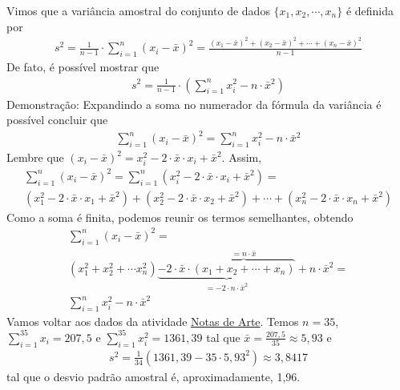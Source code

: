 Vimos que a variância amostral do conjunto de dados \(\{x_1,x_2,\cdots,x_n\}\) é definida por
\begin{equation*}
\begin{split}s^2 = \frac{1}{n-1}\cdot \sum^n_{i=1} (x_i-\bar{x})^2=\frac{(x_1-\bar{x})^2+(x_2-\bar{x})^2+\cdots+(x_n-\bar{x})^2}{n-1}\end{split}
\end{equation*}
De fato, é possível mostrar que
\begin{equation*}
\begin{split}s^2 = \frac{1}{n-1}\cdot \left (\sum^n_{i=1} x^2_i-n\cdot \bar{x}^2\right )\end{split}
\end{equation*}
Demonstração:  Expandindo a soma no numerador da fórmula da variância é possível concluir que
\begin{equation*}
\begin{split}\sum^n_{i=1}(x_i-\bar{x})^2= \sum^n_{i=1} x^2_i -n\cdot \bar{x}^2\end{split}
\end{equation*}
Lembre que \((x_i-\bar{x})^2=x^2_i-2\cdot \bar{x}\cdot x_i+\bar{x}^2\). Assim,
\begin{equation*}
\begin{split} \sum^n_{i=1}(x_i-\bar{x})^2=\sum^n_{i=1}(x^2_i-2\cdot \bar{x}\cdot x_i+\bar{x}^2)=\\ (x^2_1-2\cdot\bar{x}\cdot x_1+\bar{x}^2)+(x^2_2-2\cdot\bar{x}\cdot x_2+\bar{x}^2)+ \cdots + (x^2_n-2\cdot\bar{x}\cdot x_n+\bar{x}^2)\end{split}
\end{equation*}
Como a soma é finita, podemos reunir os termos semelhantes, obtendo
\begin{equation*}
\begin{split}\sum^n_{i=1}(x_i-\bar{x})^2= \\ (x^2_1+x^2_2+\cdots x^2_n)\underbrace{-2\cdot \bar{x}\cdot \overbrace{(x_1+x_2+\cdots+x_n)}^{=n\cdot \bar{x}}}_{=-2\cdot n\cdot \bar{x}^2}+n\cdot \bar{x}^2= \\ \sum^n_{i=1} x^2_i-n\cdot\bar{x}^2\end{split}
\end{equation*}
Vamos voltar aos dados da atividade \hyperref[\detokenize{PE104-0:ativ-notas-de-artes}]{Notas de Arte}. Temos \(n=35\), \(\displaystyle{\sum^{35}_{i=1}}x_i=207,5\) e \(\displaystyle{\sum^{35}_{i=1}}x^2_i=1361,39\)  tal que \(\bar{x}=\frac{207,5}{35}\approx 5,93\) e
\begin{equation*}
\begin{split}s^2=\frac{1}{34}\left ( 1361,39-35\cdot 5,93^2\right )\approx 3,8417\end{split}
\end{equation*}
tal que o desvio padrão amostral é, aproximadamente, 1,96.


